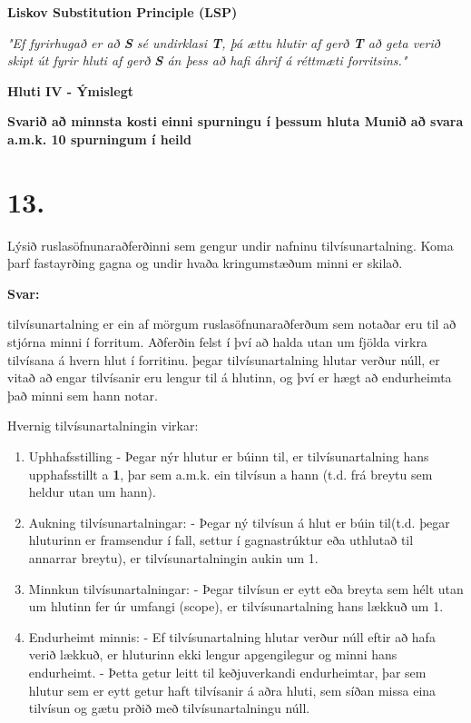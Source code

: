 \documentclass{article}
\newcommand{\sv}{\textbf{Svar:}}
\newcommand{\bo}[1]{\textbf{#1}}
\begin{document}
 \bo{Liskov Substitution Principle (LSP)}

 \textit{"Ef fyrirhugað er að \bo{S} sé undirklasi \bo{T}, þá ættu hlutir af gerð \bo{T} að geta verið skipt út fyrir hluti af gerð \textbf{S} 
 án þess að hafi áhrif á réttmæti forritsins."}

 





 \newpage

 \begin{center}
    \bo{Hluti IV - Ýmislegt}


    \bo{Svarið að minnsta kosti einni spurningu í þessum hluta 
    Munið að svara a.m.k. 10 spurningum í heild}
 \end{center}

 \section{13.}
 Lýsið ruslasöfnunaraðferðinni sem gengur undir nafninu 
 tilvísunartalning. Koma þarf fastayrðing gagna og undir hvaða 
 kringumstæðum minni er skilað.


 \sv

 tilvísunartalning er ein af mörgum ruslasöfnunaraðferðum sem notaðar eru til að stjórna minni í 
 forritum. Aðferðin felst í því að halda utan um fjölda virkra tilvísana á hvern hlut í forritinu. þegar
 tilvísunartalning hlutar verður núll, er vitað að engar tilvísanir eru lengur til á hlutinn, og því er hægt 
 að endurheimta það minni sem hann notar.

 Hvernig tilvísunartalningin virkar:

 \begin{enumerate}
    \item Uphhafsstilling
            - Þegar nýr hlutur er búinn til, er tilvísunartalning hans upphafsstillt a \bo{1}, þar sem a.m.k.
            ein tilvísun a hann (t.d. frá breytu sem heldur utan um hann).
    \item Aukning tilvísunartalningar:
            - Þegar ný tilvísun á hlut er búin til(t.d. þegar hluturinn er framsendur í fall, settur í
              gagnastrúktur eða uthlutað til annarrar breytu), er tilvísunartalningin aukin um 1.
    \item Minnkun tilvísunartalningar:
            - Þegar tilvísun er eytt eða breyta sem hélt utan um hlutinn fer úr umfangi (scope), er 
              tilvísunartalning hans lækkuð um 1.
    \item Endurheimt minnis:
            - Ef tilvísunartalning hlutar verður núll eftir að hafa verið lækkuð, er hluturinn ekki lengur
              apgengilegur og minni hans endurheimt. 
            - Þetta getur leitt til keðjuverkandi endurheimtar, þar sem hlutur sem er eytt getur haft 
              tilvísanir á aðra hluti, sem síðan missa eina tilvísun og gætu prðið með
              tilvísunartalningu núll.
 \end{enumerate}
\end{document}
